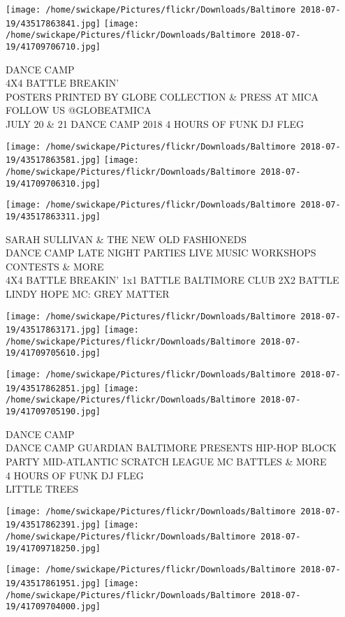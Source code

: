 \documentclass[10pt,letterpaper]{article}
\begin{document}
\texttt{[image: /home/swickape/Pictures/flickr/Downloads/Baltimore 2018-07-19/43517863841.jpg]}
\texttt{[image: /home/swickape/Pictures/flickr/Downloads/Baltimore 2018-07-19/41709706710.jpg]}

DANCE CAMP\\
4X4 BATTLE BREAKIN'\\
POSTERS PRINTED BY GLOBE COLLECTION \& PRESS AT MICA FOLLOW US @GLOBEATMICA\\
JULY 20 \& 21 DANCE CAMP 2018 4 HOURS OF FUNK DJ FLEG
\pagebreak

\texttt{[image: /home/swickape/Pictures/flickr/Downloads/Baltimore 2018-07-19/43517863581.jpg]}
\texttt{[image: /home/swickape/Pictures/flickr/Downloads/Baltimore 2018-07-19/41709706310.jpg]}

\vspace{0.25in}
\texttt{[image: /home/swickape/Pictures/flickr/Downloads/Baltimore 2018-07-19/43517863311.jpg]}

SARAH SULLIVAN \& THE NEW OLD FASHIONEDS\\
DANCE CAMP LATE NIGHT PARTIES LIVE MUSIC WORKSHOPS CONTESTS \& MORE\\
4X4 BATTLE BREAKIN' 1x1 BATTLE BALTIMORE CLUB 2X2 BATTLE LINDY HOPE MC: GREY MATTER
\pagebreak

\texttt{[image: /home/swickape/Pictures/flickr/Downloads/Baltimore 2018-07-19/43517863171.jpg]}
\texttt{[image: /home/swickape/Pictures/flickr/Downloads/Baltimore 2018-07-19/41709705610.jpg]}

\texttt{[image: /home/swickape/Pictures/flickr/Downloads/Baltimore 2018-07-19/43517862851.jpg]}
\texttt{[image: /home/swickape/Pictures/flickr/Downloads/Baltimore 2018-07-19/41709705190.jpg]}

DANCE CAMP\\
DANCE CAMP GUARDIAN BALTIMORE PRESENTS HIP{-}HOP BLOCK PARTY MID{-}ATLANTIC SCRATCH LEAGUE MC BATTLES \& MORE\\
4 HOURS OF FUNK DJ FLEG\\
LITTLE TREES
\pagebreak

\texttt{[image: /home/swickape/Pictures/flickr/Downloads/Baltimore 2018-07-19/43517862391.jpg]}
\texttt{[image: /home/swickape/Pictures/flickr/Downloads/Baltimore 2018-07-19/41709718250.jpg]}

\texttt{[image: /home/swickape/Pictures/flickr/Downloads/Baltimore 2018-07-19/43517861951.jpg]}
\texttt{[image: /home/swickape/Pictures/flickr/Downloads/Baltimore 2018-07-19/41709704000.jpg]}
\end{document}
